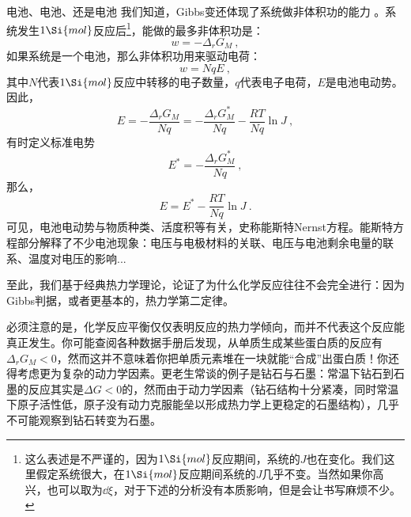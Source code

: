 \begin{example}{电池、电池、还是电池}
我们知道，Gibbs变还体现了系统做非体积功的能力 。系统发生$1 \Si{mol}$反应后\footnote{这么表述是不严谨的，因为$1 \Si{mol}$反应期间，系统的$J$也在变化。我们这里假定系统很大，在$1 \Si{mol}$反应期间系统的$J$几乎不变。当然如果你高兴，也可以取为$\dd \xi$，对于下述的分析没有本质影响，但是会让书写麻烦不少。}，能做的最多非体积功是：
$$w = - \Delta_r G_M~,$$
如果系统是一个电池，那么非体积功用来驱动电荷：
$$w = NqE~,$$
其中$N$代表$1\Si{mol}$反应中转移的电子数量，$q$代表电子电荷，$E$是电池电动势。%
因此，
$$E = -\frac{\Delta_r G_M}{Nq} = -\frac{\Delta_r G_M^*}{Nq} - \frac{RT}{Nq} \ln J ~,$$
有时定义标准电势
$$E^* = -\frac{\Delta_r G_M^*}{Nq}~,$$
那么，
$$E = E^* - \frac{RT}{Nq} \ln J ~.$$
可见，电池电动势与物质种类、活度积等有关，史称能斯特Nernst方程。能斯特方程部分解释了不少电池现象：电压与电极材料的关联、电压与电池剩余电量的联系、温度对电压的影响...
\end{example}

至此，我们基于经典热力学理论，论证了为什么化学反应往往不会完全进行：因为Gibbs判据，或者更基本的，热力学第二定律。

必须注意的是，化学反应平衡仅仅表明反应的热力学倾向，而并不代表这个反应能真正发生。你可能查阅各种数据手册后发现，从单质生成某些蛋白质的反应有 $\Delta_r G_M <0$，然而这并不意味着你把单质元素堆在一块就能“合成”出蛋白质！你还得考虑更为复杂的动力学因素。更老生常谈的例子是钻石与石墨：常温下钻石到石墨的反应其实是$\Delta G<0$的，然而由于动力学因素（钻石结构十分紧凑，同时常温下原子活性低，原子没有动力克服能垒以形成热力学上更稳定的石墨结构），几乎不可能观察到钻石转变为石墨。





